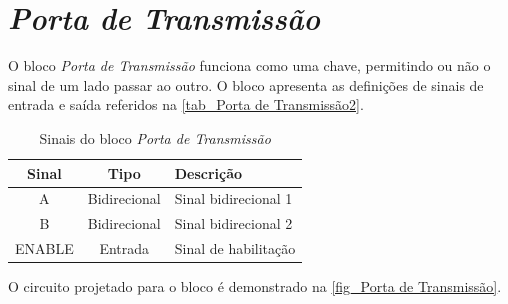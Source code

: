 \renewcommand{\NomeBloco}{\emph{Porta de Transmissão}}
\renewcommand{\NomeBlocoNoIt}{Porta de Transmissão}
\renewcommand{\NomePTab}{tab_\NomeBlocoNoIt}
\renewcommand{\NomeSTab}{tab_\NomeBlocoNoIt2}
\renewcommand{\NomePFig}{fig_\NomeBlocoNoIt}
\renewcommand{\NomeSFig}{fig_\NomeBlocoNoIt2}
\renewcommand{\NomeTTab}{tab_\NomeBlocoNoIt3}

\section{\NomeBloco}

O bloco \emph{\NomeBloco{}} funciona como uma chave, permitindo ou n\~ao o sinal de um lado passar ao outro. O bloco apresenta as defini{\c c}\~oes de sinais de entrada e sa\'ida referidos na \autoref{\NomeSTab}.

\begin{table}[htbp]
\caption{Sinais do bloco \emph{\NomeBloco}}
\label{\NomeSTab}
\centering
\begin{tabular}{ccl}

    \toprule
    Sinal & Tipo    & Descri{\c c}\~ao        \\
    \midrule \midrule
    A & Bidirecional & Sinal bidirecional 1\\
    \midrule
    B & Bidirecional & Sinal bidirecional 2\\
    \midrule
    ENABLE & Entrada & Sinal de habilita{\c c}\~ao\\
    \bottomrule
\end{tabular}
\end{table}

O circuito projetado para o bloco \'e demonstrado na \autoref{\NomePFig}.


